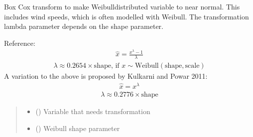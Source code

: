 \documentclass[letterpaper,10pt,english]{sphinxmanual}
\begin{document}
\begin{fulllineitems}
\label{\detokenize{misc:glomar_gridding.transformation.weibull_to_normality}}
\pysigstartsignatures
\pysiglinewithargsret
{}
{\sphinxparamcomma {}\sphinxparamcomma {}}
{}
\pysigstopsignatures
\sphinxAtStartPar
Box Cox transform to make Weibull\sphinxhyphen{}distributed variable to near normal.
This includes wind speeds, which is often modelled with Weibull.
The transformation lambda parameter depends on the shape parameter.

\sphinxAtStartPar
Reference: 
\begin{equation*}
\begin{split}\hat{x} = \frac{x^{\lambda} - 1}{\lambda}\end{split}
\end{equation*}\begin{equation*}
\begin{split}\lambda \approx 0.2654 \times \text{shape}
\text{, if } x \sim \text{Weibull}(\text{shape}, \text{scale})\end{split}
\end{equation*}
\sphinxAtStartPar
A variation to the above is proposed by Kulkarni and Powar 2011:
\begin{equation*}
\begin{split}\hat{x} = x^{\lambda}\end{split}
\end{equation*}\begin{equation*}
\begin{split}\lambda \approx 0.2776 \times \text{shape}\end{split}
\end{equation*}\begin{quote}\begin{description}
\begin{itemize}
\item {}
\sphinxAtStartPar
{} () \textendash{} Variable that needs transformation

\item {}
\sphinxAtStartPar
{} () \textendash{} Weibull shape parameter


\end{itemize}
\end{description}
\end{quote}
\end{fulllineitems}
\end{document}
